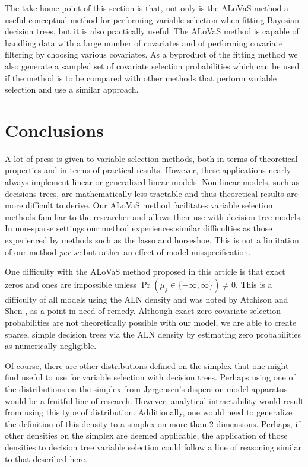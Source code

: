 		The take home point of this section is that, not only is the ALoVaS method a useful conceptual method for performing variable selection when fitting Bayesian decision trees, but it is also practically useful. The ALoVaS method is capable of handling data with a large number of covariates and of performing covariate filtering by choosing various covariates. As a byproduct of the fitting method we also generate a sampled set of covariate selection probabilities which can be used if the method is to be compared with other methods that perform variable selection and use a similar approach. 

\section{Conclusions}\label{sec:Conclusion}

A lot of press is given to variable selection methods, both in terms of theoretical properties and in terms of practical results. However, these applications nearly always implement linear or generalized linear models. Non-linear models, such as decisions trees, are mathematically less tractable and thus theoretical results are more difficult to derive. Our ALoVaS method facilitates variable selection methods familiar to the researcher and allows their use with decision tree models. In non-sparse settings our method experiences similar difficulties as those experienced by methods such as the lasso and horseshoe. This is not a limitation of our method \emph{per se} but rather an effect of model misspecification. 

One difficulty with the ALoVaS method proposed in this article is that exact zeros and ones are impossible unless $\Pr(\mu_j \in \{-\infty,\infty\})\neq 0$. This is a difficulty of all models using the ALN density and was noted by Atchison and Shen \cite{atchison1980logistic}, as a point in need of remedy. Although exact zero covariate selection probabilities are not theoretically possible with our model, we are able to create sparse, simple decision trees via the ALN density by estimating zero probabilities as numerically negligible. 

Of course, there are other distributions defined on the simplex that one might find useful to use for variable selection with decision trees. Perhaps using one of the distributions on the simplex from J\o rgensen's \cite{jorgensen1997theory} dispersion model apparatus would be a fruitful line of research. However, analytical intractability would result from using this type of distribution. Additionally, one would need to generalize the definition of this density to a simplex on more than 2 dimensions. Perhaps, if other densities on the simplex are deemed applicable, the application of those densities to decision tree variable selection could follow a line of reasoning similar to that described here. 

